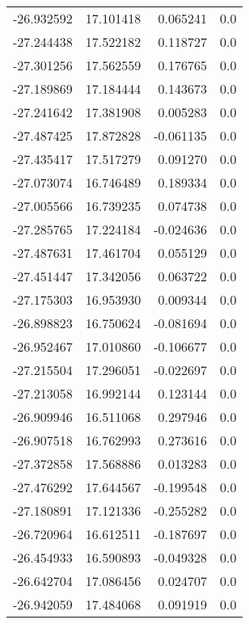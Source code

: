 \begin{tabular}{rrrr}
      -26.932592 &        17.101418 &    0.065241 &   0.0 \\
      -27.244438 &        17.522182 &    0.118727 &   0.0 \\
      -27.301256 &        17.562559 &    0.176765 &   0.0 \\
      -27.189869 &        17.184444 &    0.143673 &   0.0 \\
      -27.241642 &        17.381908 &    0.005283 &   0.0 \\
      -27.487425 &        17.872828 &   -0.061135 &   0.0 \\
      -27.435417 &        17.517279 &    0.091270 &   0.0 \\
      -27.073074 &        16.746489 &    0.189334 &   0.0 \\
      -27.005566 &        16.739235 &    0.074738 &   0.0 \\
      -27.285765 &        17.224184 &   -0.024636 &   0.0 \\
      -27.487631 &        17.461704 &    0.055129 &   0.0 \\
      -27.451447 &        17.342056 &    0.063722 &   0.0 \\
      -27.175303 &        16.953930 &    0.009344 &   0.0 \\
      -26.898823 &        16.750624 &   -0.081694 &   0.0 \\
      -26.952467 &        17.010860 &   -0.106677 &   0.0 \\
      -27.215504 &        17.296051 &   -0.022697 &   0.0 \\
      -27.213058 &        16.992144 &    0.123144 &   0.0 \\
      -26.909946 &        16.511068 &    0.297946 &   0.0 \\
      -26.907518 &        16.762993 &    0.273616 &   0.0 \\
      -27.372858 &        17.568886 &    0.013283 &   0.0 \\
      -27.476292 &        17.644567 &   -0.199548 &   0.0 \\
      -27.180891 &        17.121336 &   -0.255282 &   0.0 \\
      -26.720964 &        16.612511 &   -0.187697 &   0.0 \\
      -26.454933 &        16.590893 &   -0.049328 &   0.0 \\
      -26.642704 &        17.086456 &    0.024707 &   0.0 \\
      -26.942059 &        17.484068 &    0.091919 &   0.0 \\

\end{tabular}
